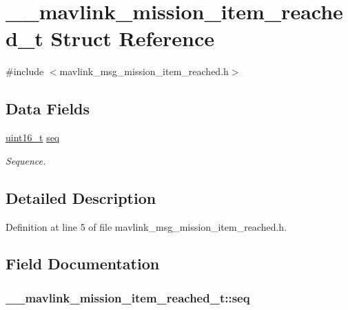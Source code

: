 \hypertarget{struct____mavlink__mission__item__reached__t}{\section{\-\_\-\-\_\-mavlink\-\_\-mission\-\_\-item\-\_\-reached\-\_\-t Struct Reference}
\label{struct____mavlink__mission__item__reached__t}
}


{\ttfamily \#include $<$mavlink\-\_\-msg\-\_\-mission\-\_\-item\-\_\-reached.\-h$>$}

\subsection*{Data Fields}
\begin{DoxyCompactItemize}
\item 
\hyperlink{stdint_8h_a273cf69d639a59973b6019625df33e30}{uint16\-\_\-t} \hyperlink{struct____mavlink__mission__item__reached__t_acdab74a4633c0c3b3dfcfa75c9d2b234}{seq}
\begin{DoxyCompactList}\small\item\em Sequence. \end{DoxyCompactList}\end{DoxyCompactItemize}


\subsection{Detailed Description}


Definition at line 5 of file mavlink\-\_\-msg\-\_\-mission\-\_\-item\-\_\-reached.\-h.



\subsection{Field Documentation}
\hypertarget{struct____mavlink__mission__item__reached__t_acdab74a4633c0c3b3dfcfa75c9d2b234}{
\subsubsection[{seq}]{ \-\_\-\-\_\-mavlink\-\_\-mission\-\_\-item\-\_\-reached\-\_\-t\-::seq}}\label{struct____mavlink__mission__item__reached__t_acdab74a4633c0c3b3dfcfa75c9d2b234}


